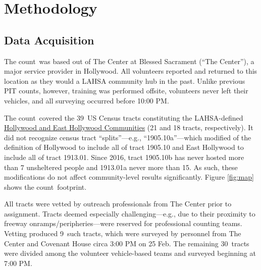 \documentclass[11pt,twocolumn]{article}
\def\Count{count}
\def\ntracts{39}
\def\nprof{9}
\def\nvol{30}
\def\resp{respectively}
\begin{document}
\section{Methodology}
\label{sec:procedure}
%
%

\subsection{Data Acquisition}
\label{sec:acquisition}

The \Count\ was based out of The Center at Blessed Sacrament (``The Center''), a major service 
provider in Hollywood. All volunteers reported and returned to this location as they would a LAHSA 
community hub in the past. Unlike previous PIT counts, however, training was performed offsite, 
volunteers never left their vehicles, and all surveying occurred before 10:00 PM.

The \Count\ covered the \ntracts\ US Census tracts constituting the LAHSA-defined 
\href{https://www.lahsa.org/data?id=45-2020-homeless-count-by-community-city}{Hollywood 
and East Hollywood Communities} (21 and 18 tracts, \resp). It did not recognize census 
tract ``splits''---e.g., ``1905.10a''---which modified of the definition of Hollywood to include 
all of tract 1905.10 and East Hollywood to include all of tract 1913.01. Since 2016, tract 1905.10b has 
never hosted more than 7 unsheltered people and 1913.01a never more than 15. As such,
these modifications do not affect community-level results significantly.
Figure \ref{fig:map} shows the \Count\ footprint.

All tracts were vetted by outreach professionals from The Center prior to assignment. Tracts 
deemed especially challenging---e.g., due to their proximity to freeway onramps/peripheries---were 
reserved for professional counting teams. Vetting produced \nprof\ such tracts, which were surveyed 
by personnel from The Center and Covenant House circa 3:00 PM on 25 Feb. The remaining \nvol\ 
tracts were divided among the volunteer vehicle-based teams and surveyed beginning at 7:00 PM. 
\end{document}
